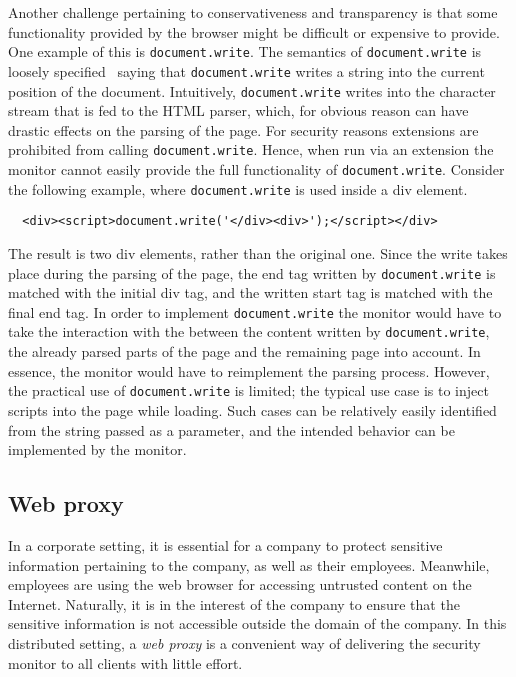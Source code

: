\documentclass{llncs}
\newcommand{\todo}[1]{\colorbox{red}{\textcolor{white}{\sffamily\bfseries\scriptsize TODO}} \textcolor{red}{#1} \textcolor{red}{$\blacktriangleleft$}}
\begin{document}
Another challenge pertaining to conservativeness and transparency is that some
functionality provided by the browser might be difficult or expensive to
provide.  One example of this is \lstinline{document.write}. The semantics of
\lstinline{document.write} is loosely specified~\cite{DOM:LVL2} saying that
\lstinline{document.write} writes a string into the current position of the
document.  Intuitively, \lstinline{document.write} writes into the character
stream that is fed to the HTML parser, which, for obvious reason can have
drastic effects on the parsing of the page. For security reasons extensions are
prohibited from calling \lstinline{document.write}. Hence, when run via an
extension the monitor cannot easily provide the full functionality of
\lstinline{document.write}.  Consider the following example, where
\lstinline{document.write} is used inside a div element.

\begin{verbatim}
  <div><script>document.write('</div><div>');</script></div>
\end{verbatim}

The result is two div elements, rather than the original one. Since the write
takes place during the parsing of the page, the end tag written by
\lstinline{document.write} is matched with the initial div tag, and the written
start tag is matched with the final end tag. In order to implement
\lstinline{document.write} the monitor would have to take the interaction with the
between the content written by \lstinline{document.write}, the already parsed parts
of the page and the remaining page into account. In essence, the monitor would
have to reimplement the parsing process.  However, the practical use of
\lstinline{document.write} is limited; the typical use case is to inject scripts
into the page while loading. Such cases can be relatively easily identified
from the string passed as a parameter, and the intended behavior can be
implemented by the monitor.




\subsection{Web proxy}
\label{sec:arch-web}
In a corporate setting, it is essential for a company to protect 
sensitive information pertaining to the company, as well as their employees. 
Meanwhile, employees are using the web browser for accessing untrusted content on 
the Internet. Naturally, it is in the interest of the company to ensure that 
the sensitive information is not accessible outside the domain of the company.
In this distributed setting, a \emph{web proxy} is a convenient way of delivering 
the security monitor to all clients with little effort. 
\end{document}
